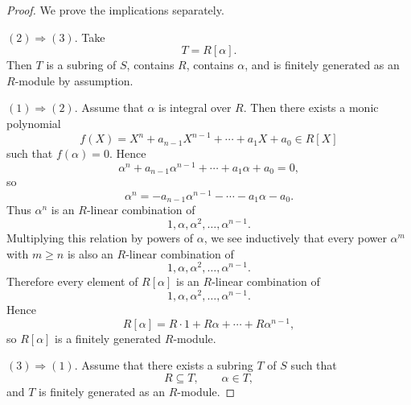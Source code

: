 \begin{proof}
    We prove the implications separately.

    \medskip

    \noindent
    \((2)\Rightarrow (3)\).
    Take
    \[
        T=R[\alpha].
    \]
    Then \(T\) is a subring of \(S\), contains \(R\), contains \(\alpha\), and is finitely
    generated as an \(R\)-module by assumption.

    \medskip

    \noindent
    \((1)\Rightarrow (2)\).
    Assume that \(\alpha\) is integral over \(R\). Then there exists a monic polynomial
    \[
        f(X)=X^n+a_{n-1}X^{n-1}+\cdots+a_1X+a_0\in R[X]
    \]
    such that \(f(\alpha)=0\). Hence
    \[
        \alpha^n+a_{n-1}\alpha^{n-1}+\cdots+a_1\alpha+a_0=0,
    \]
    so
    \[
        \alpha^n
        =
        -a_{n-1}\alpha^{n-1}
        -\cdots
        -a_1\alpha
        -a_0.
    \]
    Thus \(\alpha^n\) is an \(R\)-linear combination of
    \[
        1,\alpha,\alpha^2,\dots,\alpha^{n-1}.
    \]
    Multiplying this relation by powers of \(\alpha\), we see inductively that every
    power \(\alpha^m\) with \(m\ge n\) is also an \(R\)-linear combination of
    \[
        1,\alpha,\alpha^2,\dots,\alpha^{n-1}.
    \]
    Therefore every element of \(R[\alpha]\) is an \(R\)-linear combination of
    \[
        1,\alpha,\alpha^2,\dots,\alpha^{n-1}.
    \]
    Hence
    \[
        R[\alpha]
        =
        R\cdot 1+R\alpha+\cdots+R\alpha^{n-1},
    \]
    so \(R[\alpha]\) is a finitely generated \(R\)-module.

    \medskip

    \noindent
    \((3)\Rightarrow (1)\).
    Assume that there exists a subring \(T\) of \(S\) such that
    \[
        R\subseteq T,\qquad \alpha\in T,
    \]
    and \(T\) is finitely generated as an \(R\)-module.


\end{proof}
